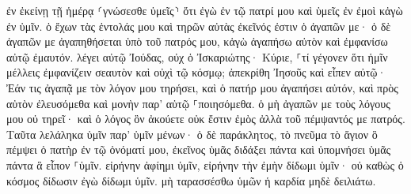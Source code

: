 \documentclass{openreader}
\begin{document}
ἐν ἐκείνῃ τῇ ἡμέρᾳ ⸂γνώσεσθε ὑμεῖς⸃ ὅτι ἐγὼ ἐν τῷ πατρί μου καὶ ὑμεῖς ἐν ἐμοὶ κἀγὼ ἐν ὑμῖν. 
ὁ ἔχων τὰς ἐντολάς μου καὶ τηρῶν αὐτὰς ἐκεῖνός ἐστιν ὁ ἀγαπῶν με· ὁ δὲ ἀγαπῶν με ἀγαπηθήσεται ὑπὸ τοῦ πατρός μου, κἀγὼ ἀγαπήσω αὐτὸν καὶ ἐμφανίσω αὐτῷ ἐμαυτόν. 
λέγει αὐτῷ Ἰούδας, οὐχ ὁ Ἰσκαριώτης· Κύριε, ⸀τί γέγονεν ὅτι ἡμῖν μέλλεις ἐμφανίζειν σεαυτὸν καὶ οὐχὶ τῷ κόσμῳ; 
ἀπεκρίθη Ἰησοῦς καὶ εἶπεν αὐτῷ· Ἐάν τις ἀγαπᾷ με τὸν λόγον μου τηρήσει, καὶ ὁ πατήρ μου ἀγαπήσει αὐτόν, καὶ πρὸς αὐτὸν ἐλευσόμεθα καὶ μονὴν παρ’ αὐτῷ ⸀ποιησόμεθα. 
ὁ μὴ ἀγαπῶν με τοὺς λόγους μου οὐ τηρεῖ· καὶ ὁ λόγος ὃν ἀκούετε οὐκ ἔστιν ἐμὸς ἀλλὰ τοῦ πέμψαντός με πατρός. 
Ταῦτα λελάληκα ὑμῖν παρ’ ὑμῖν μένων· 
ὁ δὲ παράκλητος, τὸ πνεῦμα τὸ ἅγιον ὃ πέμψει ὁ πατὴρ ἐν τῷ ὀνόματί μου, ἐκεῖνος ὑμᾶς διδάξει πάντα καὶ ὑπομνήσει ὑμᾶς πάντα ἃ εἶπον ⸀ὑμῖν. 
εἰρήνην ἀφίημι ὑμῖν, εἰρήνην τὴν ἐμὴν δίδωμι ὑμῖν· οὐ καθὼς ὁ κόσμος δίδωσιν ἐγὼ δίδωμι ὑμῖν. μὴ ταρασσέσθω ὑμῶν ἡ καρδία μηδὲ δειλιάτω. 
\end{document}
